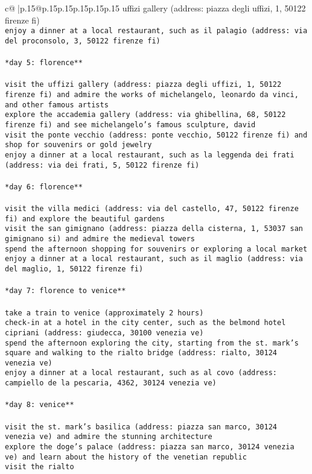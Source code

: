 \documentclass{article}
\begin{document}
{\begin{supertabular}{c@{$\;$}|p{.15\linewidth}@{}p{.15\linewidth}p{.15\linewidth}p{.15\linewidth}p{.15\linewidth}p{.15\linewidth}}
{{{uffizi gallery (address: piazza degli uffizi, 1, 50122 firenze fi)\\ \tt * enjoy a dinner at a local restaurant, such as il palagio (address: via del proconsolo, 3, 50122 firenze fi)\\ \tt \\ \tt **day 5: florence**\\ \tt \\ \tt * visit the uffizi gallery (address: piazza degli uffizi, 1, 50122 firenze fi) and admire the works of michelangelo, leonardo da vinci, and other famous artists\\ \tt * explore the accademia gallery (address: via ghibellina, 68, 50122 firenze fi) and see michelangelo's famous sculpture, david\\ \tt * visit the ponte vecchio (address: ponte vecchio, 50122 firenze fi) and shop for souvenirs or gold jewelry\\ \tt * enjoy a dinner at a local restaurant, such as la leggenda dei frati (address: via dei frati, 5, 50122 firenze fi)\\ \tt \\ \tt **day 6: florence**\\ \tt \\ \tt * visit the villa medici (address: via del castello, 47, 50122 firenze fi) and explore the beautiful gardens\\ \tt * visit the san gimignano (address: piazza della cisterna, 1, 53037 san gimignano si) and admire the medieval towers\\ \tt * spend the afternoon shopping for souvenirs or exploring a local market\\ \tt * enjoy a dinner at a local restaurant, such as il maglio (address: via del maglio, 1, 50122 firenze fi)\\ \tt \\ \tt **day 7: florence to venice**\\ \tt \\ \tt * take a train to venice (approximately 2 hours)\\ \tt * check-in at a hotel in the city center, such as the belmond hotel cipriani (address: giudecca, 30100 venezia ve)\\ \tt * spend the afternoon exploring the city, starting from the st. mark's square and walking to the rialto bridge (address: rialto, 30124 venezia ve)\\ \tt * enjoy a dinner at a local restaurant, such as al covo (address: campiello de la pescaria, 4362, 30124 venezia ve)\\ \tt \\ \tt **day 8: venice**\\ \tt \\ \tt * visit the st. mark's basilica (address: piazza san marco, 30124 venezia ve) and admire the stunning architecture\\ \tt * explore the doge's palace (address: piazza san marco, 30124 venezia ve) and learn about the history of the venetian republic\\ \tt * visit the rialto }}}
\end{supertabular}}
\end{document}
